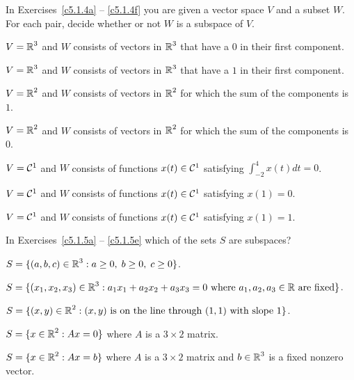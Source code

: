 \documentclass{ximera}
\begin{document}
\noindent In Exercises~\ref{c5.1.4a} -- \ref{c5.1.4f} you are given a
vector space $V$ and a subset $W$.  For each pair, decide whether or
not $W$ is a subspace of $V$.
\begin{exercise} \label{c5.1.4a}
$V=\mbox{$\Bbb{R}$}^3$ and $W$ consists of vectors in $\mbox{$\Bbb{R}$}^3$
     that have a $0$ in their first component.
\end{exercise}
\begin{exercise} \label{c5.1.4b}
$V=\mbox{$\Bbb{R}$}^3$ and $W$ consists of vectors in $\mbox{$\Bbb{R}$}^3$
     that have a $1$ in their first component.
\end{exercise}
\begin{exercise} \label{c5.1.4d}
$V=\mbox{$\Bbb{R}$}^2$ and $W$ consists of vectors in $\mbox{$\Bbb{R}$}^2$
     for which the sum of the components is $1$.
\end{exercise}
\begin{exercise} \label{c5.1.4c}
$V=\mbox{$\Bbb{R}$}^2$ and $W$ consists of vectors in $\mbox{$\Bbb{R}$}^2$
     for which the sum of the components is $0$.
\end{exercise}
\begin{exercise} \label{c5.1.4g}
$V={\cal C}^1$ and $W$ consists of functions
     $x(t)\in{\cal C}^1$ satisfying $\int_{-2}^4x(t)dt =0$.
\end{exercise}
\begin{exercise} \label{c5.1.4e}
$V={\cal C}^1$ and $W$ consists of functions
     $x(t)\in{\cal C}^1$ satisfying $x(1)=0$.
\end{exercise}
\begin{exercise} \label{c5.1.4f}
$V={\cal C}^1$ and $W$ consists of functions
     $x(t)\in{\cal C}^1$ satisfying $x(1)=1$.
\end{exercise}

\noindent In Exercises~\ref{c5.1.5a} -- \ref{c5.1.5e} which of the
sets $S$ are subspaces?
\begin{exercise} \label{c5.1.5a}
$S = \{(a,b,c)\in\mbox{$\Bbb{R}$}^3 : a\ge 0, \; b\ge 0,\; c\ge 0\}$.
\end{exercise}
\begin{exercise} \label{c5.1.5b}
$S = \{(x_1,x_2,x_3)\in\mbox{$\Bbb{R}$}^3 : a_1x_1+a_2x_2+a_3x_3=0
\mbox{ where } a_1,a_2,a_3\in\mbox{$\Bbb{R}$} \mbox{ are fixed}\}$.
\end{exercise}
\begin{exercise} \label{c5.1.5c}
$S = \{(x,y)\in\mbox{$\Bbb{R}$}^2: (x,y) \mbox{ is on the line through }
(1,1) \mbox{ with slope } 1\}$.
\end{exercise}
\begin{exercise} \label{c5.1.5d}
$S = \{x\in\mbox{$\Bbb{R}$}^2: Ax=0\}$ where $A$ is a $3\times 2$ matrix.
\end{exercise}
\begin{exercise} \label{c5.1.5e}
$S = \{x\in\mbox{$\Bbb{R}$}^2: Ax=b\}$ where $A$ is a $3\times 2$ matrix
	and $b\in\mbox{$\Bbb{R}$}^3$ is a fixed nonzero vector.
\end{exercise}
\end{document}
